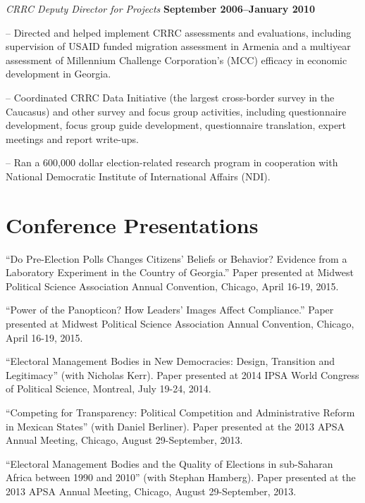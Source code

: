 \documentclass[margin,line]{res}
\newenvironment{list1}{
  \begin{list}{\ding{113}}{%
      \setlength{\itemsep}{0in}
      \setlength{\parsep}{0in} \setlength{\parskip}{0in}
      \setlength{\topsep}{0in} \setlength{\partopsep}{0in} 
      \setlength{\leftmargin}{0.17in}}}{\end{list}}
\begin{document}
{\begin{resume}
\vspace{-.3cm}
{\em CRRC Deputy Director for Projects} \hfill {\bf
  September 2006--January 2010}\\

\vspace{-.3cm}
\begin{list1} 
\item[]-- Directed and helped implement CRRC assessments and evaluations,
  including supervision of USAID funded migration assessment in
  Armenia and a multiyear assessment of Millennium Challenge
  Corporation's (MCC) efficacy in economic development in
  Georgia. 
\item[]-- Coordinated CRRC Data Initiative (the largest cross-border
  survey in the Caucasus) and other survey and focus group activities,
  including questionnaire development, focus group guide development,
  questionnaire translation, expert meetings and report write-ups. 
\item[]-- Ran a 600,000 dollar election-related research program in
  cooperation with National Democratic Institute of International
  Affairs (NDI).
\end{list1}

\section{\sc Conference Presentations}
``Do Pre-Election Polls Changes Citizens' Beliefs or Behavior?
Evidence from a Laboratory Experiment in the Country of Georgia.''
Paper presented at Midwest Political Science Association Annual
Convention, Chicago, April 16-19, 2015.

``Power of the Panopticon? How Leaders' Images Affect Compliance.''
Paper presented at Midwest Political Science Association Annual
Convention, Chicago, April 16-19, 2015.

``Electoral Management Bodies in New Democracies:
Design, Transition and Legitimacy'' (with Nicholas Kerr). Paper
presented at 2014 IPSA World Congress of Political Science, Montreal, July 19-24, 2014. 

``Competing for Transparency: Political Competition and Administrative
Reform in Mexican States'' (with Daniel Berliner). Paper presented at
the 2013 APSA Annual Meeting, Chicago, August 29-September, 2013.

``Electoral Management Bodies and the Quality of Elections in
 sub-Saharan Africa between 1990 and 2010'' (with Stephan Hamberg).
Paper presented at
the 2013 APSA Annual Meeting, Chicago, August 29-September, 2013.


\end{resume}}
\end{document}
